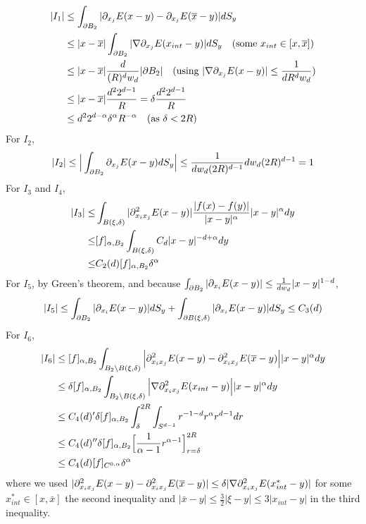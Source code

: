 \documentclass[12pt,a4paper]{article}
\newenvironment{proof}
{\begin{changemargin}{1cm}{0.5cm} 
	}%
	{\end{changemargin}
}
\newenvironment{p}
{\begin{proof} 
	}%
	{\end{proof}
}
\begin{document}
\begin{p}
\begin{align*}
|I_1| &\leq \int_{\partial B_2} |\partial_{x_j} E(x-y) - \partial_{x_j} E(\overline{x}-y)|dS_y \\
&\leq |x-\overline{x}|\int_{\partial B_2} |\nabla \partial_{x_j} E(x_{int} -y)| dS_y \quad (\text{some } x_{int} \in [x,\overline{x}]) \\
&\leq |x-\overline{x}| \frac{d}{(R)^d w_d} |\partial B_2| \quad (\text{using } |\nabla \partial_{x_j} E(x-y)|\leq \frac{1}{dR^d w_d}) \\
&\leq |x-\overline{x}| \frac{d^2 2^{d-1}}{R} = \delta \frac{d^2 2^{d-1}}{R} \\
&\leq d^2 2^{d-\alpha} \delta^{\alpha} R^{-\alpha} \quad (\text{as } \delta < 2R)
\end{align*}
For $I_2$,
\begin{align*}
|I_2| \leq \Big| \int_{\partial B_2} \partial_{x_j} E(x-y) dS_y \Big| \leq \frac{1}{dw_d (2R)^{d-1}} dw_d (2R)^{d-1} =1
\end{align*}
For $I_3$ and $I_4$,
\begin{align*}
|I_3| \leq &\int_{B(\xi, \delta)} |\partial_{x_i x_j}^2 E(x-y)| \frac{|f(x)-f(y)|}{|x-y|^{\alpha}} |x-y|^{\alpha} dy \\
\leq & [f]_{\alpha, B_2} \int_{B(\xi, \delta)} C_d|x-y|^{-d +\alpha} dy \\
\leq & C_2(d) [f]_{\alpha, B_2} \delta^{\alpha}
\end{align*}
For $I_5$, by Green's theorem, and because $\int_{\partial B_2} |\partial_{x_i} E(x-y) | \leq \frac{1}{dw_d}|x-y|^{1-d}$,
\begin{align*}
|I_5| \leq \int_{\partial B_2} |\partial_{x_i} E(x-y) | dS_y + \int_{\partial B(\xi, \delta)}| \partial_{x_i} E(x-y)|dS_y \leq C_3(d) 
\end{align*}
For $I_6$, 
\begin{align*}
|I_6| &\leq [f]_{\alpha, B_2} \int_{B_2 \backslash B(\xi, \delta)} \Big|\partial^2_{x_i x_j} E(x-y) -\partial^2_{x_i x_j} E(\overline{x}-y)\Big| |x-y|^{\alpha} dy \\
&\leq \delta[f]_{\alpha, B_2} \int_{B_2 \backslash B(\xi, \delta)} \Big| \nabla \partial_{x_i x_j}^2 E(x_{int} -y)\Big| |x-y|^{\alpha} dy \\
&\leq C_4(d)' \delta[f]_{\alpha, B_2} \int_{\delta}^{2R} \int_{S^{d-1}} r^{-1-d} r^{\alpha} r^{d-1} dr \\
&\leq C_4(d)'' \delta[f]_{\alpha, B_2}\Big[ \frac{1}{\alpha-1}r^{\alpha-1}\Big]_{r=\delta}^{2R} \\
&\leq C_4(d) [f]_{C^{0, \alpha}} \delta^{\alpha}
\end{align*}
where we used $|\partial^2_{x_i x_j} E(x-y) -\partial^2_{x_i x_j} E(\overline{x}-y)| \leq \delta |\nabla \partial_{x_i x_j}^2 E(x_{int}^* - y)|$ for some $x^*_{int} \in [x, \bar{x}]$ the second inequality and $|\bar{x}-y|\leq \frac{3}{2} |\xi -y| \leq 3|x_{int}-y|$ in the third inequality. 

\eop
\end{p}
\s
\end{document}
